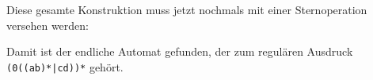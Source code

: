 \begin{loesung}
\begin{center}
\end{center}
Diese gesamte Konstruktion muss jetzt nochmals mit einer Sternoperation
versehen werden:
\begin{center}
\end{center}
Damit ist der endliche Automat gefunden, der zum 
regulären Ausdruck
\texttt{(0((ab)*|cd))*}
gehört.
\end{loesung}
